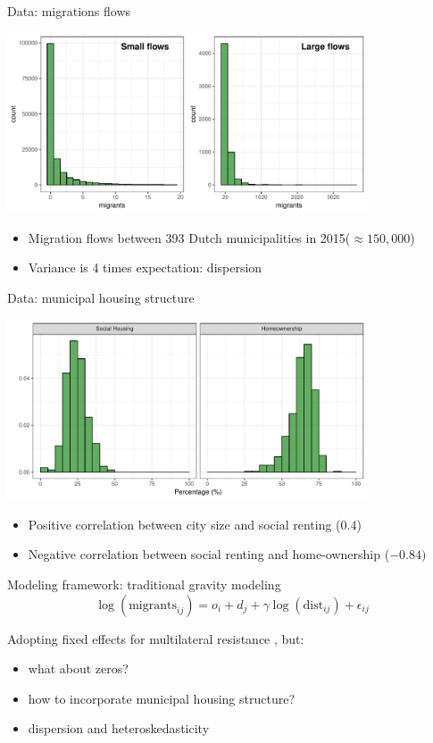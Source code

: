 \documentclass{beamer}
\begin{document}
\begin{frame}{Data: migrations flows}
	\begin{center}
		\includegraphics[width=0.8\textwidth]{../fig/hist_mig}      
	\end{center}
\begin{itemize}
	\item Migration flows \alert{between} 393 Dutch municipalities in 2015($\approx 150,000$)
	\item Variance is 4 times expectation: \alert{dispersion}
\end{itemize}
\end{frame}

\begin{frame}{Data: municipal housing structure}
\begin{center}
	\includegraphics[width=0.8\textwidth]{../fig/hist_housing}      
\end{center}
\begin{itemize}
	\item Positive correlation between city size and social renting ($0.4$)
	\item Negative correlation between social renting and home-ownership ($-0.84)$
\end{itemize}
\end{frame}

\begin{frame}{Modeling framework: traditional gravity modeling}
	\begin{equation*}
	\log(\text{migrants}_{ij}) = o_i + d_j +  \gamma\log(\text{dist}_{ij}) + \epsilon_{ij}
	\label{eq:gravfixed}
	\end{equation*} 
	
	Adopting fixed effects for multilateral resistance \citep{anderson2003gravity}, but:
	\begin{itemize}
		\item what about zeros?
		\item how to incorporate municipal housing structure?
		\item dispersion and heteroskedasticity \citep{silva2006log}
	\end{itemize}
\end{frame}
\end{document}
